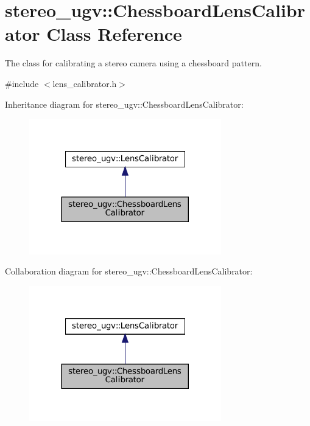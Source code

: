 \hypertarget{classstereo__ugv_1_1ChessboardLensCalibrator}{}\section{stereo\+\_\+ugv\+:\+:Chessboard\+Lens\+Calibrator Class Reference}
\label{classstereo__ugv_1_1ChessboardLensCalibrator}


The class for calibrating a stereo camera using a chessboard pattern.  




{\ttfamily \#include $<$lens\+\_\+calibrator.\+h$>$}



Inheritance diagram for stereo\+\_\+ugv\+:\+:Chessboard\+Lens\+Calibrator\+:\nopagebreak
\begin{figure}[H]
\begin{center}
\leavevmode
\includegraphics[width=236pt]{classstereo__ugv_1_1ChessboardLensCalibrator__inherit__graph}
\end{center}
\end{figure}


Collaboration diagram for stereo\+\_\+ugv\+:\+:Chessboard\+Lens\+Calibrator\+:\nopagebreak
\begin{figure}[H]
\begin{center}
\leavevmode
\includegraphics[width=236pt]{classstereo__ugv_1_1ChessboardLensCalibrator__coll__graph}
\end{center}
\end{figure}
